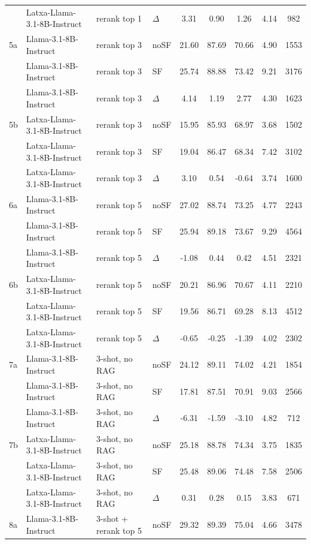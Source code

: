 \begin{scriptsize}
\begin{longtable}{l l l l c c c c c}
 & Latxa-Llama-3.1-8B-Instruct & rerank top 1 & $\Delta$ & 3.31 & 0.90 & 1.26 & 4.14 & 982 \\
\dmidrule
5a & Llama-3.1-8B-Instruct & rerank top 3 & noSF & 21.60 & 87.69 & 70.66 & 4.90 & 1553 \\
 & Llama-3.1-8B-Instruct & rerank top 3 & SF & 25.74 & 88.88 & 73.42 & 9.21 & 3176 \\
 & Llama-3.1-8B-Instruct & rerank top 3 & $\Delta$ & 4.14 & 1.19 & 2.77 & 4.30 & 1623 \\
5b & Latxa-Llama-3.1-8B-Instruct & rerank top 3 & noSF & 15.95 & 85.93 & 68.97 & 3.68 & 1502 \\
 & Latxa-Llama-3.1-8B-Instruct & rerank top 3 & SF & 19.04 & 86.47 & 68.34 & 7.42 & 3102 \\
 & Latxa-Llama-3.1-8B-Instruct & rerank top 3 & $\Delta$ & 3.10 & 0.54 & -0.64 & 3.74 & 1600 \\
\dmidrule
6a & Llama-3.1-8B-Instruct & rerank top 5 & noSF & 27.02 & 88.74 & 73.25 & 4.77 & 2243 \\
 & Llama-3.1-8B-Instruct & rerank top 5 & SF & 25.94 & 89.18 & 73.67 & 9.29 & 4564 \\
 & Llama-3.1-8B-Instruct & rerank top 5 & $\Delta$ & -1.08 & 0.44 & 0.42 & 4.51 & 2321 \\
6b & Latxa-Llama-3.1-8B-Instruct & rerank top 5 & noSF & 20.21 & 86.96 & 70.67 & 4.11 & 2210 \\
 & Latxa-Llama-3.1-8B-Instruct & rerank top 5 & SF & 19.56 & 86.71 & 69.28 & 8.13 & 4512 \\
 & Latxa-Llama-3.1-8B-Instruct & rerank top 5 & $\Delta$ & -0.65 & -0.25 & -1.39 & 4.02 & 2302 \\
\dmidrule
7a & Llama-3.1-8B-Instruct & 3-shot, no RAG & noSF & 24.12 & 89.11 & 74.02 & 4.21 & 1854 \\
 & Llama-3.1-8B-Instruct & 3-shot, no RAG & SF & 17.81 & 87.51 & 70.91 & 9.03 & 2566 \\
 & Llama-3.1-8B-Instruct & 3-shot, no RAG & $\Delta$ & -6.31 & -1.59 & -3.10 & 4.82 & 712 \\
7b & Latxa-Llama-3.1-8B-Instruct & 3-shot, no RAG & noSF & 25.18 & 88.78 & 74.34 & 3.75 & 1835 \\
 & Latxa-Llama-3.1-8B-Instruct & 3-shot, no RAG & SF & 25.48 & 89.06 & 74.48 & 7.58 & 2506 \\
 & Latxa-Llama-3.1-8B-Instruct & 3-shot, no RAG & $\Delta$ & 0.31 & 0.28 & 0.15 & 3.83 & 671 \\
\dmidrule
\rowcolor{tabhighlight}8a & Llama-3.1-8B-Instruct & 3-shot + rerank top 5 & noSF & 29.32 & 89.39 & 75.04 & 4.66 & 3478 \\

\end{longtable}
\end{scriptsize}
